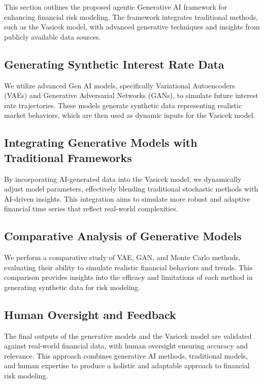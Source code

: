 \documentclass[a4paper,12pt]{scrbook}
\begin{document}
	
	This section outlines the proposed agentic Generative AI framework for enhancing financial risk modeling. The framework integrates traditional methods, such as the Vasicek model, with advanced generative techniques and insights from publicly available data sources.
	
	\subsection{Generating Synthetic Interest Rate Data}
	
	We utilize advanced Gen AI models, specifically Variational Autoencoders (VAEs) and Generative Adversarial Networks (GANs), to simulate future interest rate trajectories. These models generate synthetic data representing realistic market behaviors, which are then used as dynamic inputs for the Vasicek model.
	
	\subsection{Integrating Generative Models with Traditional Frameworks}
	
	By incorporating AI-generated data into the Vasicek model, we dynamically adjust model parameters, effectively blending traditional stochastic methods with AI-driven insights. This integration aims to simulate more robust and adaptive financial time series that reflect real-world complexities.
	
	\subsection{Comparative Analysis of Generative Models}
	
	We perform a comparative study of VAE, GAN, and Monte Carlo methods, evaluating their ability to simulate realistic financial behaviors and trends. This comparison provides insights into the efficacy and limitations of each method in generating synthetic data for risk modeling.
	
	\subsection{Human Oversight and Feedback}
	
	The final outputs of the generative models and the Vasicek model are validated against real-world financial data, with human oversight ensuring accuracy and relevance. This approach combines generative AI methods, traditional models, and human expertise to produce a holistic and adaptable approach to financial risk modeling.
	
\end{document}
